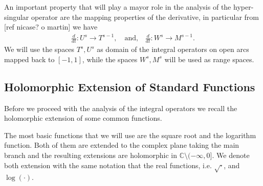 \documentclass{article}
\newcommand{\todo}[1]{{\color{red}[#1]}}
\newcommand{\IC}{{\mathbb C}}
\begin{document}
An important property that will play a mayor role in the analysis of the hyper-singular operator are the mapping properties of the derivative, in particular from \todo{ref nicase? o martin} we have 
\begin{align}
\label{eq:devprop}
\frac{d}{dt} : U^s \rightarrow T^{s-1}, \quad \text{and,} \quad 
\frac{d}{dt} : W^s \rightarrow M^{s-1}.
\end{align}
We will use the spaces $T^s,U^s$ as domain of the integral operators on open arcs mapped back to $[-1,1]$, while the spaces $W^s, M^s$ will be used as range spaces.
\subsection{Holomorphic Extension of Standard Functions}
Before we proceed with the analysis of the integral operators we recall the holomorphic extension of some common functions.

The most basic functions that we will use are the square root and the logarithm function. Both of them are extended to the complex plane taking the main branch and the resulting extensions are holomorphic in $\IC \setminus (-\infty,0]$. We denote both extension with the same notation that the real functions, i.e. $\sqrt{\cdot}$, and $\log{(\cdot)}$.   
\end{document}

